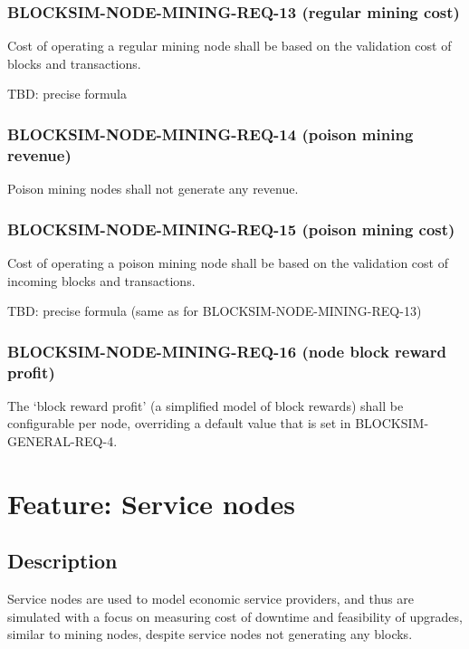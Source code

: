 \documentclass{scrreprt}
\begin{document}
      \subsubsection{BLOCKSIM-NODE-MINING-REQ-13 (regular mining cost)}

        Cost of operating a regular mining node shall be based on the
        validation cost of blocks and transactions.

        TBD: precise formula

      \subsubsection{BLOCKSIM-NODE-MINING-REQ-14 (poison mining revenue)}

        Poison mining nodes shall not generate any revenue.

      \subsubsection{BLOCKSIM-NODE-MINING-REQ-15 (poison mining cost)}

        Cost of operating a poison mining node shall be based on the validation
        cost of incoming blocks and transactions.

        TBD: precise formula (same as for BLOCKSIM-NODE-MINING-REQ-13)

      \subsubsection{BLOCKSIM-NODE-MINING-REQ-16 (node block reward profit)}

        The `block reward profit' (a simplified model of block rewards) shall
        be configurable per node, overriding a default value that is set
        in BLOCKSIM-GENERAL-REQ-4.

  \section{Feature: Service nodes}

    \subsection{Description}

      Service nodes are used to model economic service providers, and thus
      are simulated with a focus on measuring cost of downtime and feasibility
      of upgrades, similar to mining nodes, despite service nodes not
      generating
      any blocks.
\end{document}
